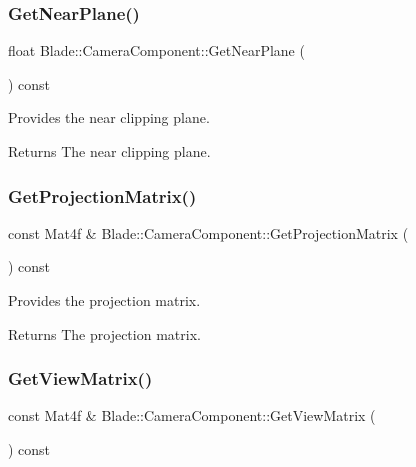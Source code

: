 \subsubsection{\texorpdfstring{Get\+Near\+Plane()}{GetNearPlane()}}
{\footnotesize\ttfamily float Blade\+::\+Camera\+Component\+::\+Get\+Near\+Plane (\begin{DoxyParamCaption}{ }\end{DoxyParamCaption}) const\hspace{0.3cm}{\ttfamily [noexcept]}}



Provides the near clipping plane. 

\begin{DoxyReturn}{Returns}
The near clipping plane. 
\end{DoxyReturn}
\mbox{\label{class_blade_1_1_camera_component_a5d79b698eb708d55538f9b8c045368c6}} 
\subsubsection{\texorpdfstring{Get\+Projection\+Matrix()}{GetProjectionMatrix()}}
{\footnotesize\ttfamily const Mat4f \& Blade\+::\+Camera\+Component\+::\+Get\+Projection\+Matrix (\begin{DoxyParamCaption}{ }\end{DoxyParamCaption}) const\hspace{0.3cm}{\ttfamily [noexcept]}}



Provides the projection matrix. 

\begin{DoxyReturn}{Returns}
The projection matrix. 
\end{DoxyReturn}
\mbox{\label{class_blade_1_1_camera_component_a5b8dbf3a13f82da25a0f21d21d92fd99}} 
\subsubsection{\texorpdfstring{Get\+View\+Matrix()}{GetViewMatrix()}}
{\footnotesize\ttfamily const Mat4f \& Blade\+::\+Camera\+Component\+::\+Get\+View\+Matrix (\begin{DoxyParamCaption}{ }\end{DoxyParamCaption}) const\hspace{0.3cm}{\ttfamily [noexcept]}}



